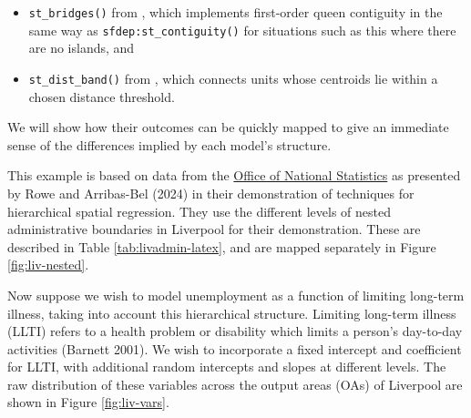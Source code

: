 \begin{itemize}
\tightlist
\item
  \texttt{st\_bridges()} from , which implements first-order queen contiguity in the same way as \texttt{sfdep:st\_contiguity()} for situations such as this where there are no islands, and
\item
  \texttt{st\_dist\_band()} from , which connects units whose centroids lie within a chosen distance threshold.
\end{itemize}

We will show how their outcomes can be quickly mapped to give an immediate sense of the differences implied by each model's structure.

This example is based on data from the \href{https://www.nomisweb.co.uk/home/census2001.asp}{Office of National Statistics} as presented by Rowe and Arribas-Bel (2024) in their demonstration of techniques for hierarchical spatial regression. They use the different levels of nested administrative boundaries in Liverpool for their demonstration. These are described in Table \ref{tab:livadmin-latex}, and are mapped separately in Figure \ref{fig:liv-nested}.

Now suppose we wish to model unemployment as a function of limiting long-term illness, taking into account this hierarchical structure. Limiting long-term illness (LLTI) refers to a health problem or disability which limits a person's day-to-day activities (Barnett 2001). We wish to incorporate a fixed intercept and coefficient for LLTI, with additional random intercepts and slopes at different levels. The raw distribution of these variables across the output areas (OAs) of Liverpool are shown in Figure
\ref{fig:liv-vars}.

